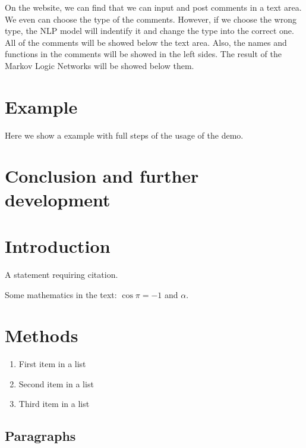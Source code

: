 \documentclass[
12pt, %
a4paper, %
oneside, %
headinclude,footinclude, %
BCOR5mm, %
]{scrartcl}
\begin{document}
On the website, we can find that we can input and post comments in a text area. We even can choose the type of the comments. However, if we choose the wrong type, the NLP model will indentify it and change the type into the correct one. All of the comments will be showed below the text area. Also, the names and functions in the comments will be showed in the left sides. The result of the Markov Logic Networks will be showed below them.

\section{Example}
Here we show a example with full steps of the usage of the demo. 

\section{Conclusion and further development}

\section{Introduction}

A statement requiring citation.

\lipsum[1-3] %

Some mathematics in the text: $\cos\pi=-1$ and $\alpha$.
 

\section{Methods}

\lipsum[5] %

\begin{enumerate}[noitemsep] %
\item First item in a list
\item Second item in a list
\item Third item in a list
\end{enumerate}


\subsection{Paragraphs}
\end{document}
